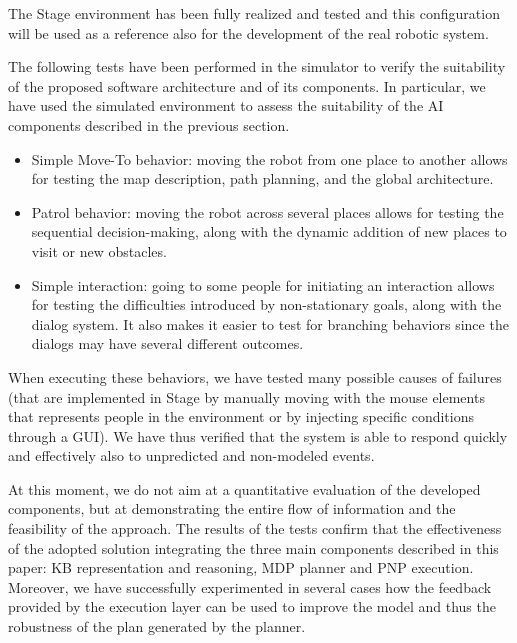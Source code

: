 The Stage environment has been fully realized and tested and this configuration will be used as a reference also for the development of the real robotic system.



The following tests have been performed in the simulator to verify the suitability of the proposed software architecture and of its components. In particular, we have used the simulated environment to assess the suitability of the AI components described in the previous section.

\begin{itemize}
\item Simple Move-To behavior: moving the robot from one place to another allows for testing the map description, path planning, and the global architecture.
\item Patrol behavior: moving the robot across several places allows for testing the sequential decision-making, along with the dynamic addition of new places to visit or new obstacles.
\item Simple interaction: going to some people for initiating an interaction allows for testing the difficulties introduced by non-stationary goals, along with the dialog system. It also makes it easier to test for branching behaviors since the dialogs may have several different outcomes.
\end{itemize}

When executing these behaviors, we have tested many possible causes of failures (that are implemented in Stage by manually moving with the mouse elements that represents people in the environment or by injecting specific conditions through a GUI). We have thus verified that the system is able to respond quickly and effectively also to unpredicted and non-modeled events.

At this moment, we do not aim at a quantitative evaluation of the developed components, but at demonstrating the entire flow of information and the feasibility of the approach.
The results of the tests confirm that the effectiveness of the adopted solution integrating the three main components described in this paper: KB representation and reasoning, MDP planner and PNP execution. Moreover, we have successfully experimented in several cases how the feedback provided by the execution layer can be used to improve the model and thus the robustness of the plan generated by the planner.


